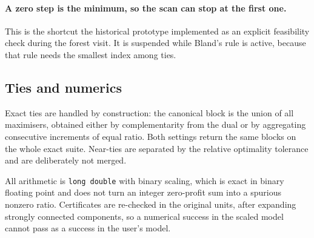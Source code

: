 \paragraph{A zero step is the minimum, so the scan can stop at the first one.}
This is the shortcut the historical prototype implemented as an explicit
feasibility check during the forest visit. It is suspended while Bland's rule is
active, because that rule needs the smallest index among ties.

\subsection{Ties and numerics}

Exact ties are handled by construction: the canonical block is the union of
all maximisers, obtained either by complementarity from the dual or by
aggregating consecutive increments of equal ratio. Both settings return the same
blocks on the whole exact suite. Near-ties are separated by the relative
optimality tolerance and are deliberately not merged.

All arithmetic is \texttt{long double} with binary scaling, which is exact in
binary floating point and does not turn an integer zero-profit sum into a
spurious nonzero ratio. Certificates are re-checked in the original units, after
expanding strongly connected components, so a numerical success in the scaled
model cannot pass as a success in the user's model.
